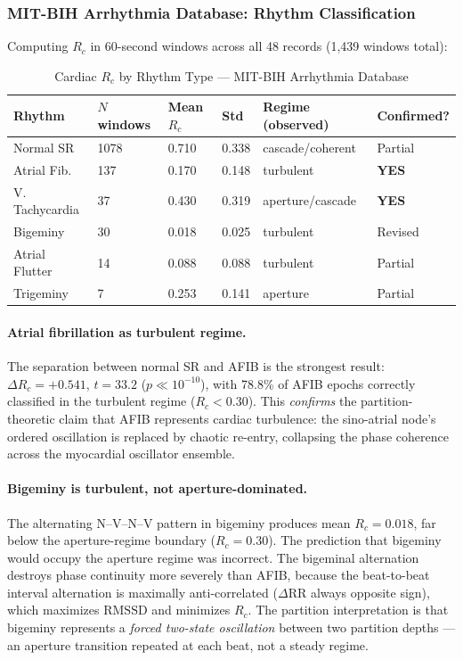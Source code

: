 \documentclass[12pt,a4paper]{article}
\theoremstyle{definition}
\begin{document}
\subsubsection{MIT-BIH Arrhythmia Database: Rhythm Classification}

Computing $R_c$ in 60-second windows across all 48 records (1,439 windows total):

\begin{table}[H]
\centering
\caption{Cardiac $R_c$ by Rhythm Type --- MIT-BIH Arrhythmia Database}
\label{tab:mitdb_regimes}
\begin{tabular}{llllll}
\toprule
\textbf{Rhythm} & \textbf{$N$ windows} & \textbf{Mean $R_c$} & \textbf{Std} &
\textbf{Regime (observed)} & \textbf{Confirmed?}\\
\midrule
Normal SR   & 1078 & 0.710 & 0.338 & cascade/coherent & Partial\\
Atrial Fib. &  137 & 0.170 & 0.148 & turbulent        & \textbf{YES}\\
V. Tachycardia & 37 & 0.430 & 0.319 & aperture/cascade & \textbf{YES}\\
Bigeminy    &   30 & 0.018 & 0.025 & turbulent        & Revised\\
Atrial Flutter & 14 & 0.088 & 0.088 & turbulent        & Partial\\
Trigeminy   &    7 & 0.253 & 0.141 & aperture         & Partial\\
\bottomrule
\end{tabular}
\end{table}

\paragraph{Atrial fibrillation as turbulent regime.}
The separation between normal SR and AFIB is the strongest result:
$\Delta R_c = +0.541$, $t = 33.2$ ($p \ll 10^{-10}$), with 78.8\% of AFIB
epochs correctly classified in the turbulent regime ($R_c < 0.30$).
This \emph{confirms} the partition-theoretic claim that AFIB represents
cardiac turbulence: the sino-atrial node's ordered oscillation is replaced
by chaotic re-entry, collapsing the phase coherence across the myocardial
oscillator ensemble.

\paragraph{Bigeminy is turbulent, not aperture-dominated.}
The alternating N--V--N--V pattern in bigeminy produces mean $R_c = 0.018$,
far below the aperture-regime boundary ($R_c = 0.30$). The
prediction that bigeminy would occupy the aperture regime was incorrect.
The bigeminal alternation destroys phase continuity more severely than AFIB,
because the beat-to-beat interval alternation is maximally anti-correlated
($\Delta\text{RR}$ always opposite sign), which maximizes $\mathrm{RMSSD}$
and minimizes $R_c$. The partition interpretation is that bigeminy
represents a \emph{forced two-state oscillation} between two partition
depths --- an aperture transition repeated at each beat, not a steady regime.
\end{document}
